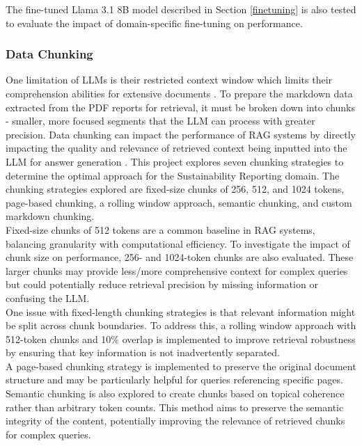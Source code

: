 The fine-tuned Llama 3.1 8B model described in Section \ref{finetuning} is also tested to evaluate the impact of domain-specific fine-tuning on performance.

\subsubsection{Data Chunking} \label{data_chunking_methods}

One limitation of LLMs is their restricted context window which limits their comprehension abilities for extensive documents \cite{liu2024lost, lmsys}. To prepare the markdown data extracted from the PDF reports for retrieval, it must be broken down into chunks - smaller, more focused segments that the LLM can process with greater precision. Data chunking can impact the performance of RAG systems by directly impacting the quality and relevance of retrieved context being inputted into the LLM for answer generation \cite{liu2024lost}. This project explores seven chunking strategies to determine the optimal approach for the Sustainability Reporting domain. The chunking strategies explored are fixed-size chunks of 256, 512, and 1024 tokens, page-based chunking, a rolling window approach, semantic chunking, and custom markdown chunking. \\

Fixed-size chunks of 512 tokens are a common baseline in RAG systems, balancing granularity with computational efficiency. To investigate the impact of chunk size on performance, 256- and 1024-token chunks are also evaluated. These larger chunks may provide less/more comprehensive context for complex queries but could potentially reduce retrieval precision by missing information or confusing the LLM.\\



One issue with fixed-length chunking strategies is that relevant information might be split across chunk boundaries. To address this, a rolling window approach with 512-token chunks and 10\% overlap is implemented to improve retrieval robustness by ensuring that key information is not inadvertently separated. \\

A page-based chunking strategy is implemented to preserve the original document structure and may be particularly helpful for queries referencing specific pages. Semantic chunking is also explored to create chunks based on topical coherence rather than arbitrary token counts. This method aims to preserve the semantic integrity of the content, potentially improving the relevance of retrieved chunks for complex queries. \\


